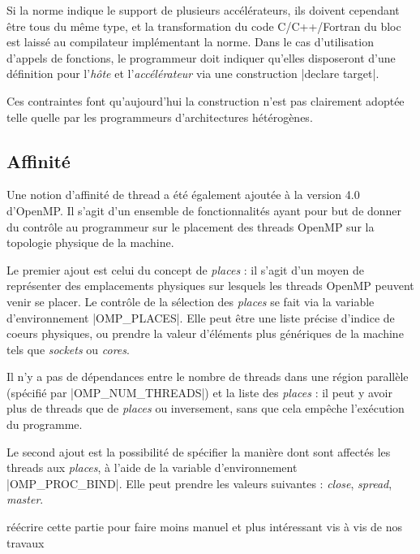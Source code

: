 Si la norme indique le support de plusieurs accélérateurs, ils doivent cependant être tous du même type, et la transformation du code C/C++/Fortran du bloc est laissé au compilateur implémentant la norme.
Dans le cas d'utilisation d'appels de fonctions, le programmeur doit indiquer qu'elles disposeront d'une définition pour l'\emph{hôte} et l'\emph{accélérateur} via une construction |declare target|.

Ces contraintes font qu'aujourd'hui la construction n'est pas clairement adoptée telle quelle par les programmeurs d'architectures hétérogènes.

\subsection{Affinité}

Une notion d'affinité de thread a été également ajoutée à la version 4.0 d'OpenMP.
Il s'agit d'un ensemble de fonctionnalités ayant pour but de donner du contrôle au programmeur sur le placement des threads OpenMP sur la topologie physique de la machine.

Le premier ajout est celui du concept de \emph{places} : il s'agit d'un moyen de représenter des emplacements physiques sur lesquels les threads OpenMP peuvent venir se placer.
Le contrôle de la sélection des \emph{places} se fait via la variable d'environnement |OMP_PLACES|.
Elle peut être une liste précise d'indice de coeurs physiques, ou prendre la valeur d'éléments plus génériques de la machine tels que \emph{sockets} ou \emph{cores}.

Il n'y a pas de dépendances entre le nombre de threads dans une région parallèle (spécifié par |OMP_NUM_THREADS|) et la liste des \emph{places} : il peut y avoir plus de threads que de \emph{places} ou inversement, sans que cela empêche l'exécution du programme.

Le second ajout est la possibilité de spécifier la manière dont sont affectés les threads aux \emph{places}, à l'aide de la variable d'environnement |OMP_PROC_BIND|.
Elle peut prendre les valeurs suivantes : \emph{close}, \emph{spread}, \emph{master}.

\begin{todo}
réécrire cette partie pour faire moins manuel et plus intéressant vis à vis de nos travaux
\end{todo}

